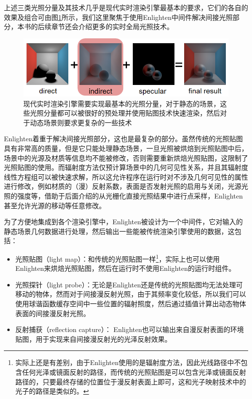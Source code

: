 上述三类光照分量及其技术几乎是现代实时渲染引擎最基本的要求，它们的各自的效果及组合可由图\ref{f:r-real-time-gi}所示，我们这里聚焦于使用Enlighten中间件解决间接光照部分，本书的后续章节还会介绍更多的实时全局光照技术。

\begin{figure}
	\includegraphics[width=1.0\textwidth]{figures/r/real-time-gi}
	\caption{现代实时渲染引擎需要实现最基本的光照分量，对于静态的场景，这些光照分量都可以被很好的预处理并使用贴图技术快速渲染，然后对于动态场景则要求更复杂的一些技术}
	\label{f:r-real-time-gi}
\end{figure}

Enlighten着重于解决间接光照部分，这也是最复杂的部分。虽然传统的光照贴图具有非常高的质量，但是它只能处理静态场景，一旦光照被烘焙到光照贴图中后，场景中的光源及材质等信息均不能被修改，否则需要重新烘焙光照贴图，这限制了光照贴图的使用。而辐射度方法仅预计算场景中的几何可见性关系，并且其辐射度线性方程组可以被快速求解，所以这允许程序在运行时对不涉及几何可见性的属性进行修改，例如材质的（漫）反射系数，表面是否发射光照的启用与关闭，光源光照的强度等，借助于后面介绍的从光栅化直接光照结果中进行点采样，Enlighten甚至允许光源的移动等任意修改。

为了方便地集成到各个渲染引擎中，Enlighten被设计为一个中间件，它对输入的静态场景几何数据进行处理，然后输出一些能被传统渲染引擎使用的数据，这包括：

\begin{itemize}
	\item 光照贴图（light map）：和传统的光照贴图一样\footnote{实际上还是有差别，由于Enlighten使用的是辐射度方法，因此光线路径中不包含任何光泽或镜面反射的路径，而传统的光照贴图是可以包含光泽或镜面反射路径的，只要最终存储的位置位于漫反射表面上即可，这和光子映射技术中的光子的路径是类似的。}，实际上也可以使用Enlighten来烘焙光照贴图，然后在运行时不使用Enlighten的运行时组件。
	\item 光照探针（light probe）：无论是Enlighten还是传统的光照贴图均无法处理可移动的物体，然而对于间接漫反射光照，由于其频率变化较低，所以我们可以使用球谐函数缓存空间中一些位置的辐射照度，然后通过插值计算出动态物体表面的间接漫反射光照。
	\item 反射捕获（reflection capture）： Enlighten也可以输出来自漫反射表面的环境贴图，用于实现来自间接漫反射光的光泽反射效果。
\end{itemize}

